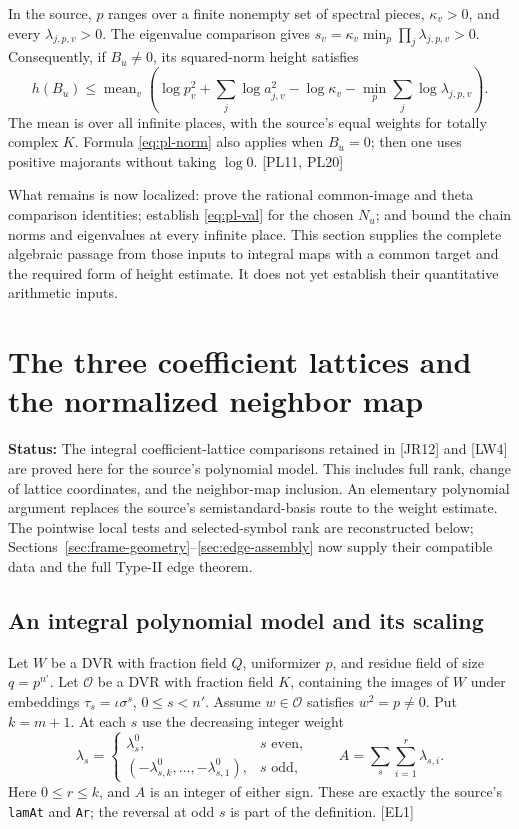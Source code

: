 \documentclass[11pt,a4paper]{article}
\numberwithin{equation}{section}
\theoremstyle{remark}\newtheorem{remark}[theorem]{Remark}
\newcommand{\status}[1]{\textbf{Status:} #1}
\begin{document}
In the source, $p$ ranges over a finite nonempty set of spectral pieces,
$\kappa_v>0$, and every $\lambda_{j,p,v}>0$. The eigenvalue comparison gives
$s_v=\kappa_v\min_p\prod_j\lambda_{j,p,v}>0$.
Consequently, if $B_u\ne0$, its squared-norm height satisfies
\begin{equation}\label{eq:pl-height}
 h(B_u)\le\operatorname{mean}_v\!\left(
 \log p_v^2+\sum_j\log a_{j,v}^2-\log\kappa_v
       -\min_p\sum_j\log\lambda_{j,p,v}\right).
\end{equation}
The mean is over all infinite places, with the source's equal weights for totally complex $K$. Formula \eqref{eq:pl-norm} also applies when $B_u=0$; then one uses positive majorants without taking $\log0$. \textsf{[PL11, PL20]}

What remains is now localized: prove the rational common-image and theta comparison identities; establish \eqref{eq:pl-val} for the chosen $N_u$; and bound the chain norms and eigenvalues at every infinite place. This section supplies the complete algebraic passage from those inputs to integral maps with a common target and the required form of height estimate. It does not yet establish their quantitative arithmetic inputs.

\section{The three coefficient lattices and the normalized neighbor map}
\label{sec:edge-lattices}

\status{The integral coefficient-lattice comparisons retained in [JR12] and [LW4] are proved here for the source's polynomial model. This includes full rank, change of lattice coordinates, and the neighbor-map inclusion. An elementary polynomial argument replaces the source's semistandard-basis route to the weight estimate. The pointwise local tests and selected-symbol rank are reconstructed below; Sections~\ref{sec:frame-geometry}--\ref{sec:edge-assembly} now supply their compatible data and the full Type-II edge theorem.}

\subsection{An integral polynomial model and its scaling}

Let $W$ be a DVR with fraction field $Q$, uniformizer $p$, and residue field of size $q=p^{n'}$. Let $\mathcal O$ be a DVR with fraction field $K$, containing the images of $W$ under embeddings $\tau_s=\iota\sigma^s$, $0\le s<n'$. Assume $w\in\mathcal O$ satisfies $w^2=p\ne0$. Put $k=m+1$. At each $s$ use the decreasing integer weight
\[
 \lambda_s=
 \begin{cases}
   \lambda^0_s,&s\text{ even},\\
   (-\lambda^0_{s,k},\ldots,-\lambda^0_{s,1}),&s\text{ odd},
 \end{cases}
 \qquad
 A=\sum_s\sum_{i=1}^{r}\lambda_{s,i}.
\]
Here $0\le r\le k$, and $A$ is an integer of either sign. These are exactly the source's \texttt{lamAt} and \texttt{Ar}; the reversal at odd $s$ is part of the definition. \textsf{[EL1]}\cite{edge-coefficients,edge-operators}
\end{document}
